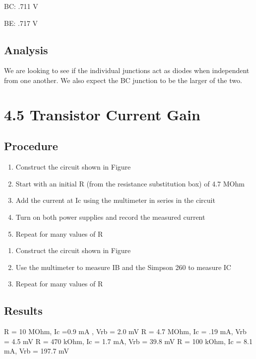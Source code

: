 \documentclass[12pt,letterpaper]{report}
\begin{document}
BC: .711 V

BE: .717 V

\subsection*{Analysis}

We are looking to see if the individual junctions act as diodes when independent from one another. We also expect the BC junction to be the larger of the two.

\section*{4.5 Transistor Current Gain}
\subsection*{Procedure}

\begin{enumerate}
\item Construct the circuit shown in Figure %
\item Start with an initial R (from the resistance substitution box) of 4.7 MOhm
\item Add the current at Ic using the multimeter in series in the circuit
\item Turn on both power supplies and record the measured current
\item Repeat for many values of R
\end{enumerate}

\begin{enumerate}
\item Construct the circuit shown in Figure %
\item Use the multimeter to measure IB and the Simpson 260 to measure IC
\item Repeat for many values of R
\end{enumerate}

\subsection*{Results}

R = 10 MOhm, Ic =0.9 mA , Vrb = 2.0 mV
R = 4.7 MOhm, Ic = .19 mA, Vrb = 4.5 mV
R = 470 kOhm, Ic = 1.7 mA, Vrb = 39.8 mV
R = 100 kOhm, Ic = 8.1 mA, Vrb = 197.7 mV
\end{document}
